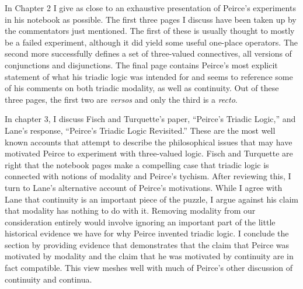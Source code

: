 In Chapter 2 I give as close to an exhaustive presentation of Peirce's experiments in his notebook as possible. The first three pages I discuss have been taken up by the commentators just mentioned. The first of these is usually thought to mostly be a failed experiment, although it did yield some useful one-place operators. The second more successfully defines a set of three-valued connectives, all versions of conjunctions and disjunctions. The final page contains Peirce's most explicit statement of what his triadic logic was intended for and seems to reference some of his comments on both triadic modality, as well as continuity. Out of these three pages, the first two are \textit{versos} and only the third is a \textit{recto}.


In chapter 3, I discuss Fisch and Turquette's paper, ``Peirce's Triadic Logic,'' and Lane's response, ``Peirce's Triadic Logic Revisited.'' These are the most well known accounts that attempt to describe the philosophical issues that may have motivated Peirce to experiment with three-valued logic. Fisch and Turquette are right that the notebook pages make a compelling case that triadic logic is connected with notions of modality and Peirce's tychism. After reviewing this, I turn to Lane's alternative account of Peirce's motivations. While I agree with Lane that continuity is an important piece of the puzzle, I argue against his claim that modality has nothing to do with it. Removing modality from our consideration entirely would involve ignoring an important part of the little historical evidence we have for why Peirce invented triadic logic. I conclude the section by providing evidence that demonstrates that the claim that Peirce was motivated by modality and the claim that he was motivated by continuity are in fact compatible. This view meshes well with much of Peirce's  other discussion of continuity and continua.

